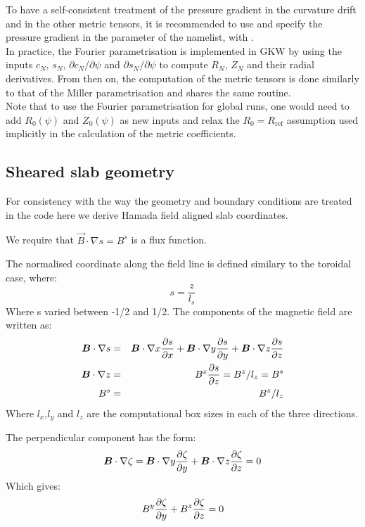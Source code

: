 To have a self-consistent treatment of the pressure gradient in the curvature drift and in the other metric tensors, it is recommended to use  and specify the pressure gradient in the  parameter of the  namelist, with .\\
In practice, the Fourier parametrisation is implemented in GKW by using the inputs $c_N$, $s_N$, $\partial c_N/\partial \psi$ and $\partial s_N/\partial \psi$ to compute $R_N$, $Z_N$ and their radial derivatives. 
From then on, the computation of the metric tensors is done similarly to that of the Miller parametrisation and shares the same routine.\\
Note that to use the Fourier parametrisation for global runs, one would need to add $R_0(\psi)$ and $Z_0(\psi)$ as new inputs and relax the $R_0=R_\textrm{ref}$ assumption used implicitly in the calculation of the metric coefficients. 


\subsection{Sheared slab geometry}

For consistency with the way the geometry and boundary conditions are treated in the code
here we derive Hamada field aligned slab coordinates.

We require that $\vec{B} \cdot \nabla s = B^{s}$ is a flux function.

The normalised coordinate along the field line is defined similary to the toroidal case, where:
\begin{equation}
s = \frac{z}{l_s}
\end{equation}
Where s varied between -1/2 and 1/2.  The components of the magnetic field are written as:
\begin{eqnarray}
\bm{B} \cdot \nabla s &=& \bm{B} \cdot \nabla x\frac{\partial s}{\partial x} + \bm{B} \cdot \nabla y\frac{\partial s}{\partial y} + \bm{B} \cdot \nabla z\frac{\partial s}{\partial z}  \\
\bm{B} \cdot \nabla z &=& B^z \frac{\partial s}{\partial z} = B^z /l_{z} = B^s \\
B^s &=& B^z / l_z
\end{eqnarray}
Where $l_x$,$l_y$ and $l_z$ are the computational box sizes in each of the three directions.

The perpendicular component has the form:
\begin{equation}
\bm{B} \cdot \nabla\zeta =  \bm{B} \cdot \nabla y \frac{\partial \zeta}{\partial y} + \bm{B} \cdot \nabla z \frac{\partial \zeta}{\partial z} = 0
\end{equation}
Which gives:
\begin{equation}
B^y \frac{\partial \zeta}{\partial y} + B^z \frac{\partial \zeta}{\partial z} = 0
\end{equation}

